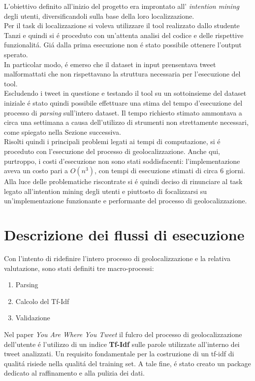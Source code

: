 \documentclass[twocolumn,10pt]{asme2ej}
\begin{document}
L'obiettivo definito all'inizio del progetto era improntato all' \textit{intention mining} degli utenti, diversificandoli sulla base della loro localizzazione. \\ Per il task di localizzazione si voleva utilizzare il tool realizzato dallo studente Tanzi e quindi si \'e proceduto con un'attenta analisi del codice e delle rispettive funzionalit\'a.
Gi\'a dalla prima esecuzione non \'e stato possibile ottenere l'output sperato. \\In particolar modo, \'e emerso che il dataset in input prensentava tweet malformattati che non rispettavano la struttura necessaria per l'esecuzione del tool. \\ Escludendo i tweet in questione e testando il tool su un sottoinsieme del dataset iniziale \'e stato quindi possibile effettuare una stima del tempo d'esecuzione del processo di \textit{parsing} sull'intero dataset. Il tempo richiesto stimato ammontava a circa una settimana a causa dell'utilizzo di strumenti non strettamente necessari, come spiegato nella Sezione successiva.  \\ Risolti quindi i principali problemi legati ai tempi di computazione, si \'e proceduto con l'esecuzione del processo di geolocalizzazione. Anche qui, purtroppo, i costi d'esecuzione non sono stati soddisfacenti: l'implementazione aveva un costo pari a $O(n^3)$, con tempi di esecuzione stimati di circa 6 giorni.\\ Alla luce delle problematiche riscontrate si \'e quindi deciso di rinunciare al task legato all'intention mining degli utenti e piuttosto di focalizzarsi su un'implementazione funzionante e performante del processo di geolocalizzazione.

\section{Descrizione dei flussi di esecuzione}


Con l'intento di ridefinire l'intero processo di geolocalizzazione e la relativa valutazione, sono stati definiti tre macro-processi:
\begin{enumerate}
\item Parsing
\item Calcolo del Tf-Idf
\item Validazione
\end{enumerate}   

Nel paper \textit{You Are Where You Tweet} il fulcro del processo di geolocalizzazione dell'utente \'e l'utilizzo di un indice \textbf{Tf-Idf} sulle parole utilizzate all'interno dei tweet analizzati. Un requisito fondamentale per la costruzione di un tf-idf di qualit\'a risiede nella qualit\'a del training set. A tale fine, \'e stato creato un package dedicato al raffinamento e alla pulizia dei dati. 
\end{document}
